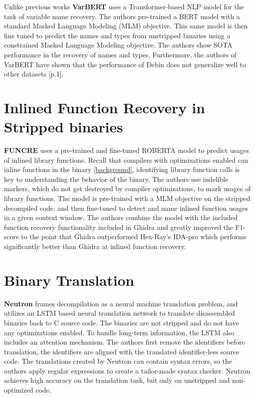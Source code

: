 Unlike previous works \textbf{VarBERT} \cite{VarBERT} uses a Transformer-based NLP model for the task of variable name recovery. The authors pre-trained a BERT model with a standard Masked Language Modeling (MLM) objective. This same model is then fine tuned to predict the names and types from unstripped binaries using a constrained Masked Language Modeling objective. The authors show SOTA performance in the recovery of names and types. Furthermore, the authors of VarBERT have shown that the performance of Debin does not generalize well to other datasets \cite{VarBERT}[p.1]. 

\section{Inlined Function Recovery in Stripped binaries}
\textbf{FUNCRE} uses a pre-trained and fine-tuned ROBERTA model to predict usages of inlined library functions. Recall that compilers with optimizations enabled can inline functions in the binary \ref{background}, identifying library function calls is key to understanding the behavior of the binary. The authors use indelible markers, which do not get destroyed by compiler optimizations, to mark usages of library functions. The model is pre-trained with a MLM objective on the stripped decompiled code. and then fine-tuned to detect and name inlined function usages in a given context window. The authors combine the model with the included function recovery functionality included in Ghidra and greatly improved the F1-score to the point that Ghidra outperformed Hex-Ray's IDA-pro which performs significantly better than Ghidra at inlined function recovery. 

\section{Binary Translation}
\textbf{Neutron} \cite{Neutron} frames decompilation as a neural machine translation problem, and utilizes an LSTM based neural translation network to translate disassembled binaries back to C source code. The binaries are not stripped and do not have any optimizations enabled. To handle long-term information, the LSTM also includes an attention mechanism. The authors first remove the identifiers before translation, the identifiers are aligned with the translated identifier-less source code. The translations created by Neutron can contain syntax errors, so the authors apply regular expressions to create a tailor-made syntax checker. Neutron achieves high accuracy on the translation task, but only on unstripped and non-optimized code.

